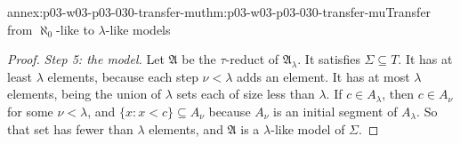 \begin{annexitem}{annex:p03-w03-p03-030-transfer-mu}{thm:p03-w03-p03-030-transfer-mu}{Transfer from \(\aleph_0\)-like to \(\lambda\)-like models}
\begin{proof}
\emph{Step 5: the model.}  Let \(\mathfrak A\) be the \(\tau\)-reduct of
\(\mathfrak A_\lambda\).  It satisfies \(\Sigma\subseteq T\).  It has at least
\(\lambda\) elements, because each step \(\nu<\lambda\) adds an element.  It
has at most \(\lambda\) elements, being the union of \(\lambda\) sets each of
size less than \(\lambda\).  If \(c\in A_\lambda\), then \(c\in A_\nu\) for
some \(\nu<\lambda\), and \(\{x:x<c\}\subseteq A_\nu\) because \(A_\nu\) is
an initial segment of \(A_\lambda\).  So that set has fewer than
\(\lambda\) elements, and \(\mathfrak A\) is a \(\lambda\)-like model of
\(\Sigma\).
\end{proof}
\end{annexitem}
